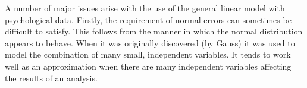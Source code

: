 



A number of major issues arise with the use of the general linear model with psychological data. Firstly, the requirement of normal errors can sometimes be difficult to satisfy. This follows from the manner in which the normal distribution appears to behave. When it was originally discovered (by Gauss) \cite{stigler1986history} it was used to model the combination of many small, independent variables. It tends to work well as an approximation when there are many independent variables affecting the results of an analysis.

